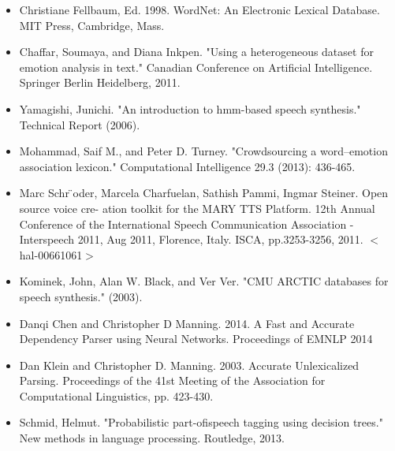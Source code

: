 \documentclass[oneside,a4paper,12pt]{book}
\begin{document}
\begin{appendices}
\begin{itemize}
	\item[\lbrack9\rbrack] Christiane Fellbaum, Ed. 1998. WordNet: An Electronic Lexical Database. MIT 	Press, Cambridge, Mass. 
	
	\item[\lbrack10\rbrack] Chaffar, Soumaya, and Diana Inkpen. "Using a heterogeneous dataset for 	emotion analysis in text." Canadian Conference on Artificial Intelligence. Springer 	Berlin Heidelberg, 2011.
	
	\item[\lbrack11\rbrack] Yamagishi, Junichi. "An introduction to hmm-based speech synthesis." Technical Report (2006).
	
	\item[\lbrack12\rbrack] Mohammad, Saif M., and Peter D. Turney. "Crowdsourcing a word–emotion association lexicon." Computational Intelligence 29.3 (2013): 436-465.
	
	\item[\lbrack13\rbrack] Marc Schr ̈oder, Marcela Charfuelan, Sathish Pammi, Ingmar Steiner. Open source voice cre-
	ation toolkit for the MARY TTS Platform. 12th Annual Conference of the International Speech
	Communication Association - Interspeech 2011, Aug 2011, Florence, Italy. ISCA, pp.3253-3256,
	2011. $<$hal-00661061$>$
	
	\item[\lbrack14\rbrack] Kominek, John, Alan W. Black, and Ver Ver. "CMU ARCTIC databases for speech synthesis." (2003).
	
	\item[\lbrack15\rbrack] Danqi Chen and Christopher D Manning. 2014. A Fast and Accurate Dependency Parser using Neural Networks. Proceedings of EMNLP 2014
	
	\item[\lbrack15\rbrack] Dan Klein and Christopher D. Manning. 2003. Accurate Unlexicalized Parsing. Proceedings of the 41st Meeting of the Association for Computational Linguistics, pp. 423-430. 
	
	\item[\lbrack16\rbrack] Schmid, Helmut. "Probabilistic part-oﬁspeech tagging using decision trees." New methods in language processing. Routledge, 2013.
\end{itemize}


\end{appendices}
\end{document}
